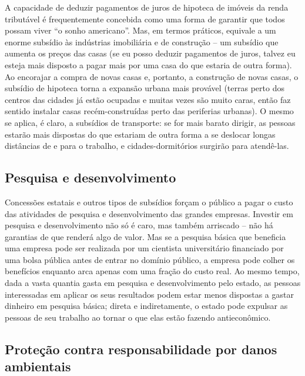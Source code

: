 A capacidade de deduzir pagamentos de juros de hipoteca de imóveis da renda tributável é frequentemente concebida como uma forma de garantir que todos possam viver ``o sonho americano''. Mas, em termos práticos, equivale a um enorme subsídio às indústrias imobiliária e de construção -- um subsídio que aumenta os preços das casas (se eu posso deduzir pagamentos de juros, talvez eu esteja mais disposto a pagar mais por uma casa do que estaria de outra forma). Ao encorajar a compra de novas casas e, portanto, a construção de novas casas, o subsídio de hipoteca torna a expansão urbana mais provável (terras perto dos centros das cidades já estão ocupadas e muitas vezes são muito caras, então faz sentido instalar casas recém-construídas perto das periferias urbanas). O mesmo se aplica, é claro, a subsídios de transporte: se for mais barato dirigir, as pessoas estarão mais dispostas do que estariam de outra forma a se deslocar longas distâncias de e para o trabalho, e cidades-dormitórios surgirão para atendê-las.

\subsection*{Pesquisa e desenvolvimento}

Concessões estatais e outros tipos de subsídios forçam o público a pagar o custo das atividades de pesquisa e desenvolvimento das grandes empresas. Investir em pesquisa e desenvolvimento não só é caro, mas também arriscado -- não há garantias de que renderá algo de valor. Mas se a pesquisa básica que beneficia uma empresa pode ser realizada por um cientista universitário financiado por uma bolsa pública antes de entrar no domínio público, a empresa pode colher os benefícios enquanto arca apenas com uma fração do custo real. Ao mesmo tempo, dada a vasta quantia gasta em pesquisa e desenvolvimento pelo estado, as pessoas interessadas em aplicar os seus resultados podem estar menos dispostas a gastar dinheiro em pesquisa básica; direta e indiretamente, o estado pode expulsar as pessoas de seu trabalho ao tornar o que elas estão fazendo antieconômico.

\subsection*{Proteção contra responsabilidade por danos ambientais}

